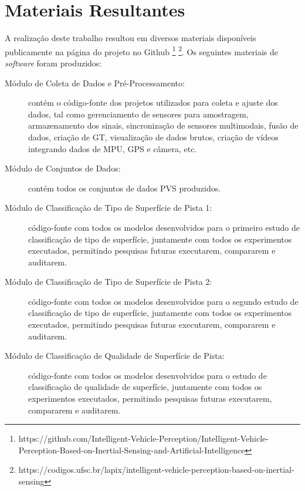 \chapter{Materiais Resultantes}
\label{cap:materiais_resultantes}

A realização deste trabalho resultou em diversos materiais disponíveis publicamente na página do projeto no Github \footnote{https://github.com/Intelligent-Vehicle-Perception/Intelligent-Vehicle-Perception-Based-on-Inertial-Sensing-and-Artificial-Intelligence} \footnote{https://codigos.ufsc.br/lapix/intelligent-vehicle-perception-based-on-inertial-sensing}. Os seguintes materiais de \textit{software} foram produzidos:

\begin{small}
\begin{description}
	
	\item[Módulo de Coleta de Dados e Pré-Processamento:] contém o código-fonte dos projetos utilizados para coleta e ajuste dos dados, tal como gerenciamento de sensores para amostragem, armazenamento dos sinais, sincronização de sensores multimodais, fusão de dados, criação de GT, visualização de dados brutos, criação de vídeos integrando dados de MPU, GPS e câmera, etc.
	
	\item[Módulo de Conjuntos de Dados:] contém todos os conjuntos de dados PVS produzidos.
	
    \item[Módulo de Classificação de Tipo de Superfície de Pista 1:] código-fonte com todos os modelos desenvolvidos para o primeiro estudo de classificação de tipo de superfície, juntamente com todos os experimentos executados, permitindo pesquisas futuras executarem, compararem e auditarem.
    
    \item[Módulo de Classificação de Tipo de Superfície de Pista 2:] código-fonte com todos os modelos desenvolvidos para o segundo estudo de classificação de tipo de superfície, juntamente com todos os experimentos executados, permitindo pesquisas futuras executarem, compararem e auditarem.
    
    \item[Módulo de Classificação de Qualidade de Superfície de Pista:] código-fonte com todos os modelos desenvolvidos para o estudo de classificação de qualidade de superfície, juntamente com todos os experimentos executados, permitindo pesquisas futuras executarem, compararem e auditarem.
    

\end{description}
\end{small}
